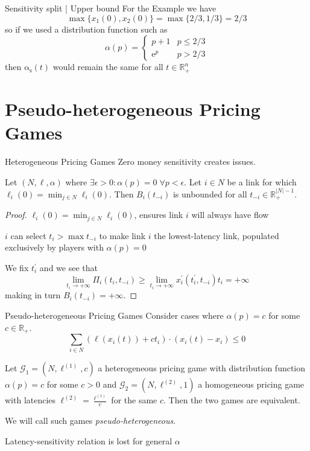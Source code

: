 \documentclass{beamer}
\newcommand{\as}{\mathrm{\alpha_s}}
\newcommand{\R}{\mathbb{R}}
\newcommand{\Gm}{\mathcal{G}}
\begin{document}
\begin{frame}{Sensitivity split | Upper bound}
	For the Example we have
	\[\max\{x_1(0), x_2(0)\} = \max\{2/3, 1/3\} = 2/3\]
	so if we used a distribution function such as
	\[
		\alpha(p) =
		\begin{cases}
			p + 1 & p \le 2/3 \\
			\mathrm{e}^p & p > 2/3
		\end{cases}
	\]
	then $\as(t)$ would remain the same for all $t \in \R_+^n$
\end{frame}


\section{Pseudo-heterogeneous Pricing Games}

\begin{frame}{Heterogeneous Pricing Games}
	Zero money sensitivity creates issues.
	\begin{lemma}
		Let $(N, \ell, \alpha)$ where $\exists \epsilon > 0: \alpha(p) = 0 \; \forall p < \epsilon$.
		Let $i \in N$ be a link for which $\ell_i(0) = \min_{j \in N} \ell_i(0)$.
		Then $B_i(t_{-i})$ is unbounded for all $t_{-i} \in \R_+^{|N| - 1}$.
	\end{lemma}
	\begin{proof}
		$\ell_i(0) = \min_{j \in N} \ell_i(0)$, ensures link $i$ will always have flow

		$i$ can select $t_i > \max t_{-i}$ to make link $i$ the lowest-latency link, populated exclusively by players with $\alpha(p) = 0$

		We fix $t_i^\prime$ and we see that
		\[
			\lim_{t_i \rightarrow +\infty} \Pi_i(t_i, t_{-i}) \ge \lim_{t_i \rightarrow +\infty} x_i^\prime(t_i^\prime, t_{-i})t_i = +\infty
		\]
		making in turn $B_i(t_{-i}) = +\infty$.
	\end{proof}
\end{frame}

\begin{frame}{Pseudo-heterogeneous Pricing Games}
	Consider cases where $\alpha(p) = c$ for some $c \in \R_+$.
	\[
		\sum_{i \in N} (\ell(x_i(t)) + c t_i) \cdot (x_i(t) - x_i) \leq 0
	\]

	\begin{lemma}
		Let $\Gm_1 = (N, \ell^{(1)}, c)$ a heterogeneous pricing game with distribution function $\alpha(p) = c$ for some $c > 0$ and $\Gm_2 = (N, \ell^{(2)}, 1)$ a homogeneous pricing game with latencies $\ell^{(2)} = \frac{\ell^{(1)}}{c}$ for the same $c$.
		Then the two games are equivalent.
	\end{lemma}
	We will call such games \textit{pseudo-heterogeneous}.

	Latency-sensitivity relation is lost for general $\alpha$
\end{frame}
\end{document}
